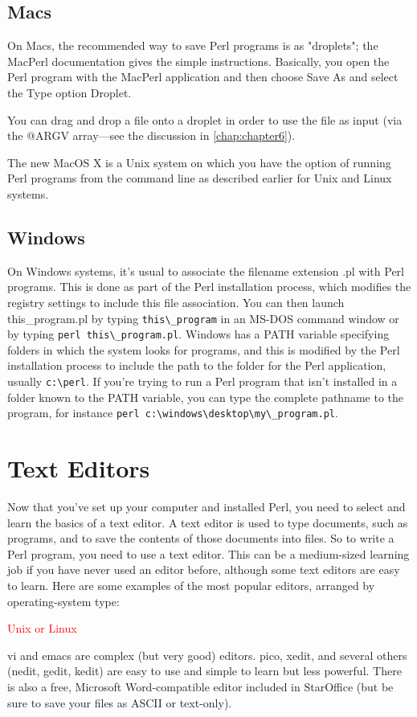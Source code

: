 \subsection{Macs}
On Macs, the recommended way to save Perl programs is as "droplets"; the MacPerl documentation gives the simple instructions. Basically, you open the Perl program with the MacPerl application and then choose Save As and select the Type option Droplet.

You can drag and drop a file onto a droplet in order to use the file as input (via the @ARGV array—see the discussion in \ref{chap:chapter6}).

The new MacOS X is a Unix system on which you have the option of running Perl programs from the command line as described earlier for Unix and Linux systems.

\subsection{Windows}
On Windows systems, it's usual to associate the filename extension .pl with Perl programs. This is done as part of the Perl installation process, which modifies the registry settings to include this file association. You can then launch this\_program.pl by typing \verb|this\_program| in an MS-DOS command window or by typing \verb|perl this\_program.pl|. Windows has a PATH variable specifying folders in which the system looks for programs, and this is modified by the Perl installation process to include the path to the folder for the Perl application, usually \verb|c:\perl|. If you're trying to run a Perl program that isn't installed in a folder known to the PATH variable, you can type the complete pathname to the program, for instance \verb|perl c:\windows\desktop\my\_program.pl|.

\section{Text Editors}
Now that you've set up your computer and installed Perl, you need to select and learn the basics of a text editor. A text editor is used to type documents, such as programs, and to save the contents of those documents into files. So to write a Perl program, you need to use a text editor. This can be a medium-sized learning job if you have never used an editor before, although some text editors are easy to learn. Here are some examples of the most popular editors, arranged by operating-system type:

\textcolor{red}{Unix or Linux}
\begin{adjustwidth}{1cm}{}
vi and emacs are complex (but very good) editors. pico, xedit, and several others (nedit, gedit, kedit) are easy to use and simple to learn but less powerful. There is also a free, Microsoft Word-compatible editor included in StarOffice (but be sure to save your files as ASCII or text-only).
\end{adjustwidth}

